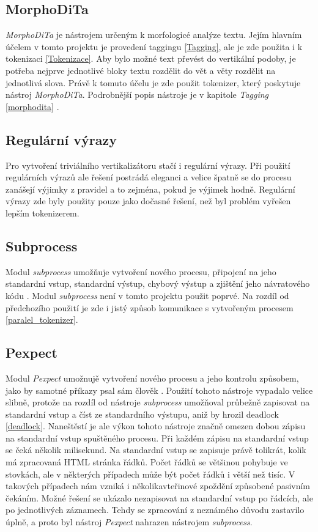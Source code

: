 \subsection{MorphoDiTa}
\textit{MorphoDiTa} je nástrojem určeným k morfologicé analýze textu. Jejím hlavním účelem v tomto projektu je
provedení taggingu \ref{Tagging}, ale je zde použita i k tokenizaci \ref{Tokenizace}.
Aby bylo možné text převést do vertikální podoby, je potřeba nejprve jednotlivé bloky
textu rozdělit do vět a věty rozdělit na jednotlivá slova. Právě k tomuto účelu
je zde použit tokenizer, který poskytuje nástroj \textit{MorphoDiTa}.
Podrobnější popis nástroje je v kapitole \textit{Tagging} \ref{morphodita} \cite{MORPHODITA}.

\subsection{Regulární výrazy}
Pro vytvoření triviálního vertikalizátoru stačí i regulární výrazy. Při použití regulárních
výrazů ale řešení postrádá eleganci a velice špatně se do procesu zanášejí výjimky z pravidel
a to zejména, pokud je výjimek hodně. Regulární výrazy zde byly použity pouze jako dočasné
řešení, než byl problém vyřešen lepším tokenizerem.

\subsection{Subprocess}
\label{subprocess}
Modul \textit{subprocess} umožňuje vytvoření nového procesu, připojení na jeho standardní vstup,
standardní výstup, chybový výstup a zjištění jeho návratového kódu \cite{SUBPROCESS}.
Modul \textit{subprocess} není v tomto projektu použit poprvé. Na rozdíl od předchozího použití
je zde i jistý způsob komunikace s vytvořeným procesem \ref{paralel_tokenizer}.

\subsection{Pexpect}
\label{pexpect}
Modul \textit{Pexpect} umožnujě vytvoření nového procesu a jeho kontrolu způsobem,
jako by samotné příkazy psal sám člověk \cite{PEXPECT}. Použití tohoto nástroje
vypadalo velice slibně, protože na rozdíl od nástroje \textit{subprocess} umožňoval průbežně
zapisovat na standardní vstup a číst ze standardního výstupu, aniž by hrozil deadlock \ref{deadlock}.
Naneštěstí je ale výkon tohoto nástroje značně omezen dobou zápisu na standardní vstup
spuštěného procesu. Při každém zápisu na standardní vstup se čeká několik milisekund.
Na standardní vstup se zapisuje právě tolikrát, kolik má zpracovaná HTML stránka řádků.
Počet řádků se většinou pohybuje ve stovkách, ale v některých případech může být počet řádků
i větší než tisíc. V takových případech nám vzniká i několikavteřinové zpoždění způsobené
pasivním čekáním. Možné řešení se ukázalo nezapisovat na standardní vstup po řádcích, ale
po jednotlivých záznamech. Tehdy se zpracování z neznámého důvodu zastavilo úplně, a proto
byl nástroj \textit{Pexpect} nahrazen nástrojem \textit{subprocess}.

